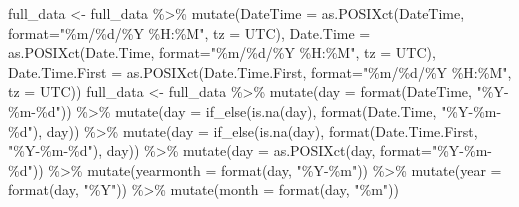 \documentclass[
]{article}
\newenvironment{Shaded}{\begin{snugshade}}{\end{snugshade}}
\newcommand{\AttributeTok}[1]{\textcolor[rgb]{0.77,0.63,0.00}{#1}}
\newcommand{\FunctionTok}[1]{\textcolor[rgb]{0.00,0.00,0.00}{#1}}
\newcommand{\NormalTok}[1]{#1}
\newcommand{\OtherTok}[1]{\textcolor[rgb]{0.56,0.35,0.01}{#1}}
\newcommand{\SpecialCharTok}[1]{\textcolor[rgb]{0.00,0.00,0.00}{#1}}
\newcommand{\StringTok}[1]{\textcolor[rgb]{0.31,0.60,0.02}{#1}}
\begin{document}
\begin{Shaded}
\begin{Highlighting}[]
\NormalTok{full\_data }\OtherTok{\textless{}{-}}\NormalTok{ full\_data }\SpecialCharTok{\%\textgreater{}\%} \FunctionTok{mutate}\NormalTok{(}\AttributeTok{DateTime =} \FunctionTok{as.POSIXct}\NormalTok{(DateTime, }\AttributeTok{format=}\StringTok{"\%m/\%d/\%Y \%H:\%M"}\NormalTok{, }\AttributeTok{tz =} \StringTok{\textquotesingle{}UTC\textquotesingle{}}\NormalTok{),}
                                  \AttributeTok{Date.Time =} \FunctionTok{as.POSIXct}\NormalTok{(Date.Time, }\AttributeTok{format=}\StringTok{"\%m/\%d/\%Y \%H:\%M"}\NormalTok{, }\AttributeTok{tz =} \StringTok{\textquotesingle{}UTC\textquotesingle{}}\NormalTok{),}
                                  \AttributeTok{Date.Time.First =} \FunctionTok{as.POSIXct}\NormalTok{(Date.Time.First, }\AttributeTok{format=}\StringTok{"\%m/\%d/\%Y \%H:\%M"}\NormalTok{, }\AttributeTok{tz =} \StringTok{\textquotesingle{}UTC\textquotesingle{}}\NormalTok{))}
\NormalTok{full\_data }\OtherTok{\textless{}{-}}\NormalTok{ full\_data }\SpecialCharTok{\%\textgreater{}\%} 
  \FunctionTok{mutate}\NormalTok{(}\AttributeTok{day =} \FunctionTok{format}\NormalTok{(DateTime, }\StringTok{"\%Y{-}\%m{-}\%d"}\NormalTok{)) }\SpecialCharTok{\%\textgreater{}\%}
  \FunctionTok{mutate}\NormalTok{(}\AttributeTok{day =} \FunctionTok{if\_else}\NormalTok{(}\FunctionTok{is.na}\NormalTok{(day), }\FunctionTok{format}\NormalTok{(Date.Time, }\StringTok{"\%Y{-}\%m{-}\%d"}\NormalTok{), day)) }\SpecialCharTok{\%\textgreater{}\%}
  \FunctionTok{mutate}\NormalTok{(}\AttributeTok{day =} \FunctionTok{if\_else}\NormalTok{(}\FunctionTok{is.na}\NormalTok{(day), }\FunctionTok{format}\NormalTok{(Date.Time.First, }\StringTok{"\%Y{-}\%m{-}\%d"}\NormalTok{), day)) }\SpecialCharTok{\%\textgreater{}\%}
  \FunctionTok{mutate}\NormalTok{(}\AttributeTok{day =} \FunctionTok{as.POSIXct}\NormalTok{(day, }\AttributeTok{format=}\StringTok{"\%Y{-}\%m{-}\%d"}\NormalTok{)) }\SpecialCharTok{\%\textgreater{}\%}
  \FunctionTok{mutate}\NormalTok{(}\AttributeTok{yearmonth =} \FunctionTok{format}\NormalTok{(day, }\StringTok{"\%Y{-}\%m"}\NormalTok{)) }\SpecialCharTok{\%\textgreater{}\%}
  \FunctionTok{mutate}\NormalTok{(}\AttributeTok{year =} \FunctionTok{format}\NormalTok{(day, }\StringTok{"\%Y"}\NormalTok{)) }\SpecialCharTok{\%\textgreater{}\%}
  \FunctionTok{mutate}\NormalTok{(}\AttributeTok{month =} \FunctionTok{format}\NormalTok{(day, }\StringTok{"\%m"}\NormalTok{))}
\end{Highlighting}
\end{Shaded}
\end{document}
